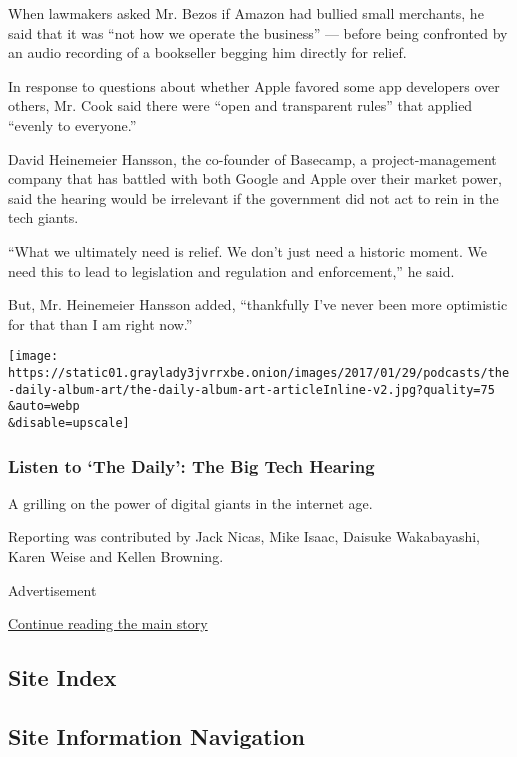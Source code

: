 When lawmakers asked Mr. Bezos if Amazon had bullied small merchants, he
said that it was ``not how we operate the business'' --- before being
confronted by an audio recording of a bookseller begging him directly
for relief.

In response to questions about whether Apple favored some app developers
over others, Mr. Cook said there were ``open and transparent rules''
that applied ``evenly to everyone.''

David Heinemeier Hansson, the co-founder of Basecamp, a
project-management company that has battled with both Google and Apple
over their market power, said the hearing would be irrelevant if the
government did not act to rein in the tech giants.

``What we ultimately need is relief. We don't just need a historic
moment. We need this to lead to legislation and regulation and
enforcement,'' he said.

But, Mr. Heinemeier Hansson added, ``thankfully I've never been more
optimistic for that than I am right now.''

\texttt{[image: https://static01.graylady3jvrrxbe.onion/images/2017/01/29/podcasts/the-daily-album-art/the-daily-album-art-articleInline-v2.jpg?quality=75\\\&auto=webp\\\&disable=upscale]}

\hypertarget{listen-to-the-daily-the-big-tech-hearing}{%
\subsubsection{Listen to `The Daily': The Big Tech
Hearing}\label{listen-to-the-daily-the-big-tech-hearing}}

A grilling on the power of digital giants in the internet age.

Reporting was contributed by Jack Nicas, Mike Isaac, Daisuke
Wakabayashi, Karen Weise and Kellen Browning.

Advertisement

\protect\hyperlink{after-bottom}{Continue reading the main story}

\hypertarget{site-index}{%
\subsection{Site Index}\label{site-index}}

\hypertarget{site-information-navigation}{%
\subsection{Site Information
Navigation}\label{site-information-navigation}}

